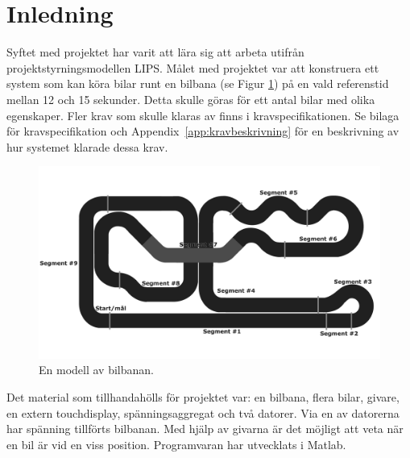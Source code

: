 \section{Inledning}

Syftet med projektet har varit att lära sig att arbeta utifrån
projektstyrningsmodellen LIPS. Målet med projektet var att konstruera ett system
som kan köra bilar runt en bilbana (se Figur \ref{fig:bilbanan}) på en vald referenstid mellan 12 och 15
sekunder. Detta skulle göras för ett antal bilar med olika egenskaper. Fler krav
som skulle klaras av finns i kravspecifikationen. Se bilaga för kravspecifikation och Appendix~\ref{app:kravbeskrivning} för en beskrivning av
hur systemet klarade dessa krav.

\begin{figure}
	\centering
	\includegraphics[width=\linewidth] {Figures/BanaModell}
	\caption{En modell av bilbanan.}
	\label{fig:bilbanan}
\end{figure} 

Det material som tillhandahölls för projektet var: en bilbana, flera bilar, givare, en extern touchdisplay, spänningsaggregat och två datorer.
Via en av datorerna har spänning tillförts
bilbanan. Med hjälp av givarna är det möjligt att veta när en bil är vid en viss position. Programvaran har utvecklats i Matlab.